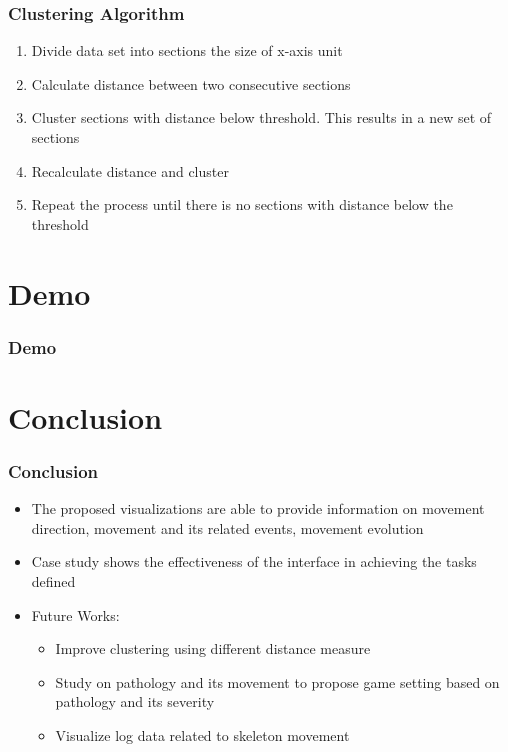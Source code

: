 \documentclass{beamer}
\begin{document}
\begin{frame}
\frametitle{Clustering Algorithm}
\begin{enumerate}
\item Divide data set into sections the size of x-axis unit
\item Calculate distance between two consecutive sections
\item Cluster sections with distance below threshold. This results in a new set of sections
\item Recalculate distance and cluster
\item Repeat the process until there is no sections with distance below the threshold
\end{enumerate}
\end{frame}

\section{Demo}
\begin{frame}
\frametitle{Demo}
\end{frame}

\section{Conclusion}
\begin{frame}
\frametitle{Conclusion}
\begin{itemize}
\item The proposed visualizations are able to provide information on movement direction, movement and its related events, movement evolution
\item Case study shows the effectiveness of the interface in achieving the tasks defined
\item Future Works:
\begin{itemize}
\item Improve clustering using different distance measure
\item Study on pathology and its movement to propose game setting based on pathology and its severity
\item Visualize log data related to skeleton movement
\end{itemize}
\end{itemize}
\end{frame}
\end{document}
